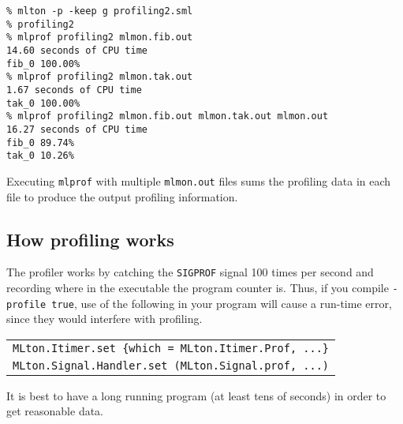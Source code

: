 \begin{verbatim}
% mlton -p -keep g profiling2.sml
% profiling2
% mlprof profiling2 mlmon.fib.out
14.60 seconds of CPU time
fib_0 100.00%
% mlprof profiling2 mlmon.tak.out
1.67 seconds of CPU time
tak_0 100.00%
% mlprof profiling2 mlmon.fib.out mlmon.tak.out mlmon.out
16.27 seconds of CPU time
fib_0 89.74%
tak_0 10.26%
\end{verbatim}

Executing {\tt mlprof} with multiple {\tt mlmon.out} files sums the
profiling data in each file to produce the output profiling
information.

\subsection{How profiling works}

The profiler works by catching the {\tt SIGPROF} signal 100 times per
second and recording where in the executable the program counter is.
Thus, if you compile {\tt -profile true}, use of the following in your
program will cause a run-time error, since they would interfere with
profiling.

\begin{tabular}{l}
\tt MLton.Itimer.set \{which = MLton.Itimer.Prof, ...\}\\
\tt MLton.Signal.Handler.set (MLton.Signal.prof, ...)
\end{tabular}

It is best to have a long running program (at least tens of seconds)
in order to get reasonable data.
